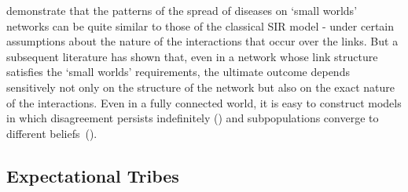 



\cite{moore2000epidemics} demonstrate that the patterns of the spread of diseases on `small worlds' networks can be quite similar to those of the classical SIR model - under certain assumptions about the nature of the interactions that occur over the links.  But a subsequent literature has shown that, even in a network whose link structure satisfies the `small worlds' requirements, the ultimate outcome depends sensitively not only on the structure of the network but also on the exact nature of the interactions.  Even in a fully connected world, it is easy to construct models in which disagreement persists indefinitely (\cite{acemouglu2013opinion}) and subpopulations converge to different beliefs~(\cite{sikder2020minimalistic}).%


\subsection{Expectational Tribes}\label{subsec:ExpTribes}\hypertarget{ExpTribes}{}

